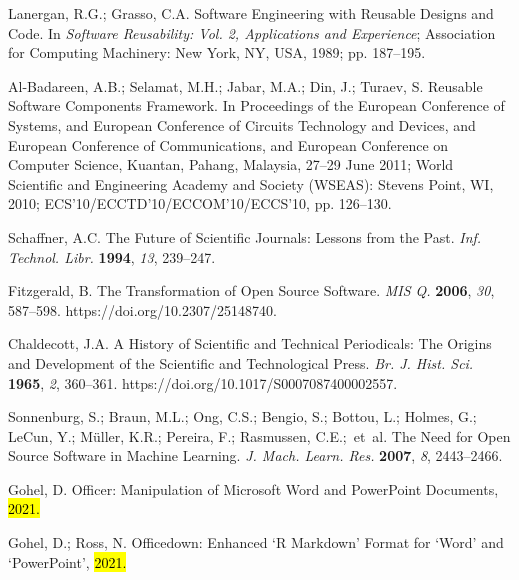 \documentclass[psych,tutorial,accept,moreauthors,pdftex]{Definitions/mdpi}
\begin{document}
\begin{thebibliography}{999}
Lanergan, R.G.; Grasso, C.A. Software Engineering with Reusable Designs and Code. In \emph{Software Reusability: Vol. 2, Applications and Experience}; Association for Computing Machinery: New York, NY, USA, 1989; pp. 187--195.


Al-Badareen, A.B.; Selamat, M.H.; Jabar, M.A.; Din, J.; Turaev, S. Reusable Software Components Framework. In Proceedings of the European Conference of Systems, and European Conference of Circuits Technology and Devices, and European Conference of Communications, and European Conference on Computer Science, Kuantan, Pahang, Malaysia, 27--29 June 2011; World Scientific and Engineering Academy and Society (WSEAS): Stevens Point, WI, 2010; ECS’10/ECCTD’10/ECCOM’10/ECCS’10, pp. 126--130.


Schaffner, A.C. The Future of Scientific Journals: Lessons from the Past. \emph{Inf. Technol. Libr.} \textbf{1994}, \emph{13}, 239--247.


Fitzgerald, B. The Transformation of Open Source Software. \emph{MIS Q.} \textbf{2006}, \emph{30}, 587--598. https://doi.org/10.2307/25148740.


Chaldecott, J.A. A History of Scientific and Technical Periodicals: The Origins and Development of the Scientific and Technological Press. \emph{Br. J. Hist. Sci.} \textbf{1965}, \emph{2}, 360--361. https://doi.org/10.1017/S0007087400002557.

Sonnenburg, S.; Braun, M.L.; Ong, C.S.; Bengio, S.; Bottou, L.; Holmes, G.; LeCun, Y.; Müller, K.R.; Pereira, F.; Rasmussen, C.E.;~et~al. The Need for Open Source Software in Machine Learning. \emph{J. Mach. Learn. Res.} \textbf{2007}, \emph{8}, 2443--2466.

Gohel, D. Officer: Manipulation of Microsoft Word and PowerPoint Documents, \hl{2021.}%

Gohel, D.; Ross, N. Officedown: Enhanced ‘R Markdown’ Format for ‘Word’ and ‘PowerPoint’, \hl{2021.}%
\end{thebibliography}
\end{document}
